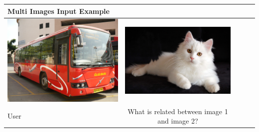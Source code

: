 \documentclass[preprint]{article}
\begin{document}
\begin{table}[hbt!]
  \setlength{\extrarowheight}{3pt} %
  \renewcommand{\arraystretch}{1.5} %
    \begin{tabular}{lcccl}
      \hline
      \textbf{Multi Images Input Example} \\[6pt]  %
      \hline
      \hline 
      \includegraphics[width=0.45\linewidth,keepaspectratio]{pic/R.jpeg} & \includegraphics[width=0.45\linewidth,keepaspectratio]{pic/Persian-cat-breed.jpg} \\
      User & What is related between image 1 and image 2? \\
      \hline
    \end{tabular}
\end{table}
\end{document}
